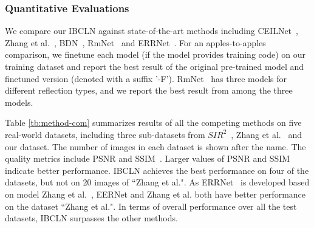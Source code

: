 \documentclass[10pt,twocolumn,letterpaper]{article}
\begin{document}
\subsubsection{Quantitative Evaluations}
We compare our IBCLN against state-of-the-art methods including CEILNet~\cite{fan2017generic}, Zhang et al.~\cite{zhang2018single}, BDN~\cite{yang2018seeing}, RmNet~\cite{wen2019single} and ERRNet~\cite{wei2019single}. For an apples-to-apples comparison, we finetune each model (if the model provides training code) on our training dataset and report the best result of the original pre-trained model and finetuned version (denoted with a suffix ’-F’). RmNet~\cite{wen2019single} has three models for different reflection types, and we report the best result from among the three models.
\begin{table}[!t]
    \centering
    \caption{Ablation study of IBCLN for architecture on three testing sets. w/o $\bm{G_R}$ means training with only one sub-network $\bm{G_T}$. w/o iteration means the total time steps is 1. Each term contributes to the SIRR performance, and combining all achieves the best results.}
    \footnotesize
    \vspace{2pt}
    \vspace{-1.5em}
    \label{tb:block}
\end{table}

Table \ref{tb:method-com} summarizes results of all the competing methods on five real-world datasets, including three sub-datasets from $SIR^2$~\cite{wan2017benchmarking}, Zhang et al.~\cite{zhang2018single} and our dataset. The number of images in each dataset is shown after the name. The quality metrics include PSNR and SSIM~\cite{wang2004image}. Larger values of PSNR and SSIM indicate better performance. IBCLN achieves the best performance on four of the datasets, but not on 20 images of ``Zhang et al.". As ERRNet~\cite{wei2019single} is developed based on model Zhang et al.~\cite{zhang2018single}, EERNet and Zhang et al. both have better performance on the dataset ``Zhang et al.". In terms of overall performance over all the test datasets, IBCLN surpasses the other methods.
\end{document}

